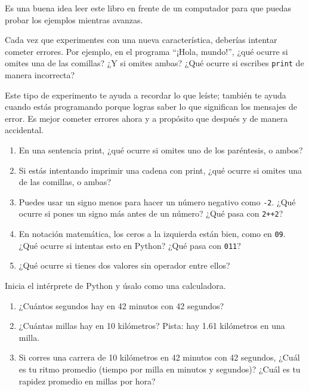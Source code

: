 \documentclass[10pt]{book}
\begin{document}
\begin{exercise}

Es una buena idea leer este libro en frente de un computador para que puedas
probar los ejemplos mientras avanzas.

Cada vez que experimentes con una nueva característica, deberías intentar
cometer errores.  Por ejemplo, en el programa ``¡Hola, mundo!'',
¿qué ocurre si omites una de las comillas?  ¿Y
si omites ambas?  ¿Qué ocurre si escribes {\tt print} de manera incorrecta?

Este tipo de experimento te ayuda a recordar lo que leíste; también
te ayuda cuando estás programando porque logras saber lo que significan los
mensajes de error.  Es mejor cometer errores ahora y a propósito que
después y de manera accidental.

\begin{enumerate}

\item En una sentencia print, ¿qué ocurre si omites uno
de los paréntesis, o ambos?

\item Si estás intentando imprimir una cadena con print, ¿qué ocurre si
omites una de las comillas, o ambas?

\item Puedes usar un signo menos para hacer un número negativo como
{\tt -2}.  ¿Qué ocurre si pones un signo más antes de un número?
¿Qué pasa con {\tt 2++2}?

\item En notación matemática, los ceros a la izquierda están bien, como en {\tt 09}.
¿Qué ocurre si intentas esto en Python?  ¿Qué pasa con {\tt 011}?

\item ¿Qué ocurre si tienes dos valores sin operador
entre ellos?

\end{enumerate}

\end{exercise}



\begin{exercise}

Inicia el intérprete de Python y úsalo como una calculadora.

\begin{enumerate}

\item ¿Cuántos segundos hay en 42 minutos con 42 segundos?

\item ¿Cuántas millas hay en 10 kilómetros?  Pista: hay 1.61
  kilómetros en una milla.

\item Si corres una carrera de 10 kilómetros en 42 minutos con 42 segundos,
  ¿Cuál es tu ritmo promedio (tiempo por milla en minutos y segundos)?  ¿Cuál
  es tu rapidez promedio en millas por hora?


\end{enumerate}

\end{exercise}
\end{document}

